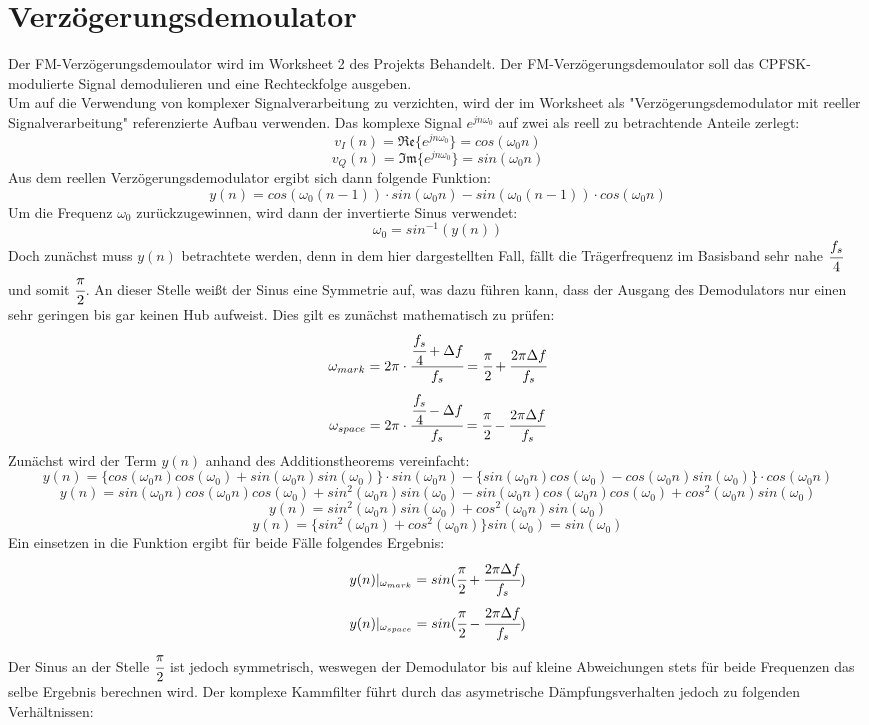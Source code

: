 \documentclass{article}
\begin{document}
\section{Verzögerungsdemoulator} \label{sec:fm-demod}
Der FM-Verzögerungsdemoulator wird im Worksheet 2 des Projekts Behandelt. 
Der FM-Verzögerungsdemoulator soll das CPFSK-modulierte Signal demodulieren und eine Rechteckfolge ausgeben.\\
Um auf die Verwendung von komplexer Signalverarbeitung zu verzichten, wird der im Worksheet als "Verzögerungsdemodulator mit reeller Signalverarbeitung" referenzierte Aufbau verwenden. Das komplexe Signal $e^{jn\omega_0}$ auf zwei als reell zu betrachtende Anteile zerlegt:
$$
v_I(n) = \mathfrak{Re}\{e^{jn\omega_0}\} = cos(\omega_0 n)
$$
$$
v_Q(n) = \mathfrak{Im}\{e^{jn\omega_0}\} = sin(\omega_0 n)
$$
Aus dem reellen Verzögerungsdemodulator ergibt sich dann folgende Funktion:
$$
y(n) = cos(\omega_0 (n-1)) \cdot sin(\omega_0 n) - sin(\omega_0 (n-1)) \cdot cos(\omega_0 n) 
$$
Um die Frequenz $\omega_0$ zurückzugewinnen, wird dann der invertierte Sinus verwendet:
$$
\omega_0 = sin^{-1}(y(n))
$$ 
Doch zunächst muss $y(n)$ betrachtete werden, denn in dem hier dargestellten Fall, fällt die Trägerfrequenz im Basisband sehr nahe $\cfrac{f_s}{4}$ und somit $\cfrac{\pi}{2}$. An dieser Stelle weißt der Sinus eine Symmetrie auf, was dazu führen kann, dass der Ausgang des Demodulators nur einen sehr geringen bis gar keinen Hub aufweist. Dies gilt es zunächst mathematisch zu prüfen:
$$
\omega_{mark} = 2\pi\cdot \cfrac{\cfrac{f_s}{4}+\Delta f}{f_s}=\cfrac{\pi}{2}+\cfrac{2\pi \Delta f}{f_s}
$$
$$
\omega_{space} = 2\pi\cdot \cfrac{\cfrac{f_s}{4}-\Delta f}{f_s}=\cfrac{\pi}{2}-\cfrac{2\pi \Delta f}{f_s}
$$
Zunächst wird der Term $y(n)$ anhand des Additionstheorems vereinfacht:
$$
y(n) = \{cos(\omega_0 n)cos(\omega_0) + sin(\omega_0 n)sin(\omega_0)\} \cdot sin(\omega_0 n) - \{sin(\omega_0 n)cos(\omega_0) - cos(\omega_0 n)sin(\omega_0) \} \cdot cos(\omega_0 n) 
$$ 
$$
y(n) = sin(\omega_0 n)cos(\omega_0 n)cos(\omega_0) + sin^2(\omega_0 n)sin(\omega_0) - sin(\omega_0 n)cos(\omega_0 n)cos(\omega_0) + cos^2(\omega_0 n)sin(\omega_0) 
$$ 
$$
y(n) = sin^2(\omega_0 n)sin(\omega_0) + cos^2(\omega_0 n)sin(\omega_0) 
$$
$$
y(n) = \{sin^2(\omega_0 n) + cos^2(\omega_0 n)\}sin(\omega_0) = sin(\omega_0)
$$
Ein einsetzen in die Funktion ergibt für beide Fälle folgendes Ergebnis:
$$
y(n)\arrowvert_{\omega_{mark}} = sin(\cfrac{\pi}{2}+\cfrac{2\pi \Delta f}{f_s})
$$
$$
y(n)\arrowvert_{\omega_{space}} = sin(\cfrac{\pi}{2}-\cfrac{2\pi \Delta f}{f_s})
$$
Der Sinus an der Stelle $\cfrac{\pi}{2}$ ist jedoch symmetrisch, weswegen der Demodulator bis auf kleine Abweichungen stets für beide Frequenzen das selbe Ergebnis berechnen wird. Der komplexe Kammfilter führt durch das asymetrische Dämpfungsverhalten jedoch zu folgenden Verhältnissen:\\\\
\end{document}
